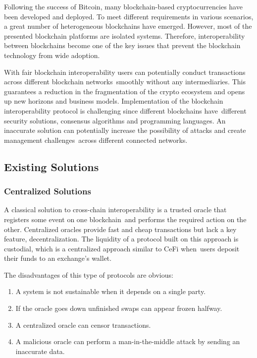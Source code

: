 Following the success of Bitcoin, many blockchain-based cryptocurrencies have been developed and deployed.
To meet different requirements in various scenarios, a great number of heterogeneous blockchains have emerged.
However, most of the presented blockchain platforms are isolated systems.
Therefore, interoperability between blockchains become one of the key issues
that prevent the blockchain technology from wide adoption.

With fair blockchain interoperability users can potentially conduct transactions across different blockchain networks\
smoothly without any intermediaries.
This guarantees a reduction in the fragmentation of the crypto ecosystem and opens up new horizons and business models.
Implementation of the blockchain interoperability protocol is challenging since different blockchains have\
different security solutions, consensus algorithms and programming languages.
An inaccurate solution can potentially increase the possibility of attacks and create management challenges\
across different connected networks.

\subsection{Existing Solutions}\label{subsec:existing-solutions}

\subsubsection{Centralized Solutions}\label{subsubsec:centralized-solutions}

A classical solution to cross-chain interoperability is a trusted oracle that registers some event on one blockchain\
and performs the required action on the other.
Centralized oracles provide fast and cheap transactions but lack a key feature, decentralization.
The liquidity of a protocol built on this approach is custodial, which is a centralized approach similar to CeFi when\
users deposit their funds to an exchange's wallet.

The disadvantages of this type of protocols are obvious:
\begin{enumerate}
    \item A system is not sustainable when it depends on a single party.
    \item If the oracle goes down unfinished swaps can appear frozen halfway.
    \item A centralized oracle can censor transactions.
    \item A malicious oracle can perform a man-in-the-middle attack by sending an inaccurate data.
\end{enumerate}

